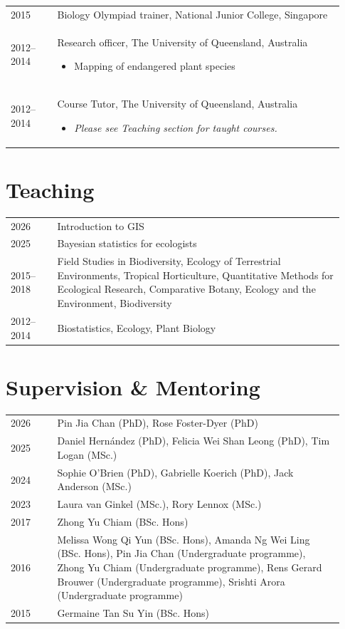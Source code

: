 \documentclass[a4paper]{article}
\begin{document}
\begin{tabular}{p{0.13\linewidth} p{0.8\linewidth}}
2015 & Biology Olympiad trainer, National Junior College, Singapore \\

2012--2014 & Research officer, The University of Queensland, Australia 
\begin{itemize}
\item Mapping of endangered plant species
\end{itemize} \\

2012--2014 & Course Tutor, The University of Queensland, Australia
\begin{itemize} 
\item \textit{Please see Teaching section for taught courses.}
\end{itemize} \\

\end{tabular}


\section*{Teaching}
\begin{tabular}{p{0.13\linewidth} p{0.8\linewidth}}
2026       & Introduction to GIS \\
2025       & Bayesian statistics for ecologists \\
2015--2018 & Field Studies in Biodiversity, Ecology of Terrestrial Environments, Tropical Horticulture, Quantitative Methods for Ecological Research, Comparative Botany, Ecology and the Environment, Biodiversity \\
2012--2014 & Biostatistics, Ecology, Plant Biology \\
\end{tabular}


\section*{Supervision \& Mentoring}
\begin{tabular}{p{0.13\linewidth} p{0.8\linewidth}}
2026 & Pin Jia Chan (PhD), Rose Foster-Dyer (PhD) \\
2025 & Daniel Hernández (PhD), Felicia Wei Shan Leong (PhD), Tim Logan (MSc.) \\
2024 & Sophie O'Brien (PhD), Gabrielle Koerich (PhD), Jack Anderson (MSc.) \\
2023 & Laura van Ginkel (MSc.), Rory Lennox (MSc.) \\
2017 & Zhong Yu Chiam (BSc. Hons) \\
2016 & Melissa Wong Qi Yun (BSc. Hons), Amanda Ng Wei Ling (BSc. Hons), Pin Jia Chan (Undergraduate programme), Zhong Yu Chiam (Undergraduate programme), Rens Gerard Brouwer (Undergraduate programme), Srishti Arora (Undergraduate programme) \\
2015 & Germaine Tan Su Yin (BSc. Hons)
\end{tabular}
\end{document}
